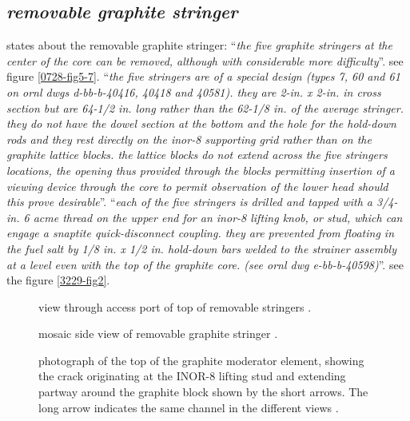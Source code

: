 \documentclass[ms,a4paper]{memoir}
\newcommand*{\mrsarchive}{../../msr-archive}%
\begin{document}
\subsection{\emph{removable graphite stringer}}
\parencite[page 84]{ornl-tm-0728} states about the removable graphite stringer:
\enquote{\textit{the five graphite stringers at the center of the core can be removed, although with considerable more difficulty}}.
see figure \ref{0728-fig5-7}.
\enquote{\textit{the five stringers are of a special design (types 7, 60 and 61 on ornl dwgs d-bb-b-40416, 40418 and 40581). they are 2-in. x 2-in. in cross section but are 64-1/2 in. long rather than the 62-1/8 in. of the average stringer. they do not have the dowel section at the bottom and the hole for the hold-down rods and they rest directly on the inor-8 supporting grid rather than on the graphite lattice blocks. the lattice blocks do not extend across the five stringers locations, the opening thus provided through the blocks permitting insertion of a viewing device through the core to permit observation of the lower head should this prove desirable}}.
\enquote{\textit{each of the five stringers is drilled and tapped with a 3/4-in. 6 acme thread on the upper end for an inor-8 lifting knob, or stud, which can engage a snaptite quick-disconnect coupling. they are prevented from floating in the fuel salt by 1/8 in. x 1/2 in. hold-down bars welded to the strainer assembly at a level even with the top of the graphite core. (see ornl dwg e-bb-b-40598)}}.
see the figure \ref{3229-fig2}.

\begin{figure}[H]
  \centering
  \centering
  \caption{view through access port of top of removable stringers \parencite[figure 1.3]{ornl-4676}.}
  \label{4676-fig1-3}
\end{figure}

\begin{figure}[H]
  \centering
  \centering
  \caption{mosaic side view of removable graphite stringer \parencite[figure 13.1]{ornl-4676}.}
  \label{4676-fig13-1}
\end{figure}

\begin{figure}[H]
  \centering
  \centering
  \caption{photograph of the top of the graphite moderator element, showing the crack originating at the INOR-8 lifting stud and extending partway around the graphite block shown by the short arrows. The long arrow indicates the same channel in the different views \parencite[figure 13.2]{ornl-4676}.}
  \label{4676-fig13-2}
\end{figure}
\end{document}
